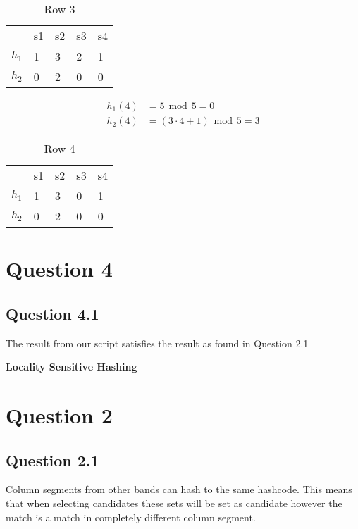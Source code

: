 \documentclass[11pt,twoside,a4paper]{article}
\begin{document}
	\begin{table}[h!]
	\centering
	\label{my-label}
	\begin{tabular}{lllll}
	 & s1 & s2 & s3 & s4 \\
	 $h_1$ & 1 & 3 & 2 & 1 \\
	 $h_2$ & 0 & 2 & 0 & 0
	\end{tabular}
	\caption{Row 3}
	\end{table}
	
	\begin{align}
		h_1(4) &= 5 \hspace{5pt} \mbox{mod} \hspace{5pt} 5 = 0 \\
		h_2(4) &= (3 \cdot 4 + 1) \hspace{5pt} \mbox{mod} \hspace{5pt} 5 = 3
	\end{align}
	
	\begin{table}[h!]
	\centering
	\label{my-label}
	\begin{tabular}{lllll}
	 & s1 & s2 & s3 & s4 \\
	 $h_1$ & 1 & 3 & 0 & 1 \\
	 $h_2$ & 0 & 2 & 0 & 0
	\end{tabular}
	\caption{Row 4}
	\end{table}

	
\section{Question 4}

 	\subsection{Question 4.1}
 	The result from our script satisfies the result as found in Question 2.1
 	
 \textbf{Locality Sensitive Hashing}
 
 \section{Question 2}
 
 	\subsection{Question 2.1}
 	Column segments from other bands can hash to the same hashcode. This means that when selecting candidates these sets will be set as candidate however the match is a match in completely different column segment.
 	 	
\end{document}
